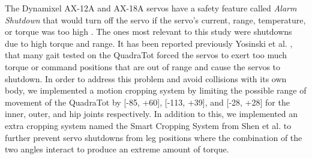 The Dynamixel AX-12A and AX-18A servos have a safety feature called \emph{Alarm Shutdown} that would turn off the servo if the servo's current, range, temperature, or torque was too high \cite{robotis}. 
The ones most relevant to this study were shutdowns due to high torque and range. 
It has been reported previously Yosinski et al. \cite{yos:clune}, that many gait tested on the QuadraTot forced the servos to exert too much torque or command positions that are out of range and cause the servos to shutdown. In order to address this problem and avoid collisions with its own body, we implemented a motion cropping system by limiting the possible range of movement of the QuadraTot by [-85\degree, +60\degree], [-113\degree, +39\degree], and [-28\degree, +28\degree] for the inner, outer, and hip joints respectively.
In addition to this, we implemented an extra cropping system named the Smart Cropping System from Shen et al. \cite{haocheng} to further prevent servo shutdowns from leg positions where the combination of the two angles interact to produce an extreme amount of torque. %


